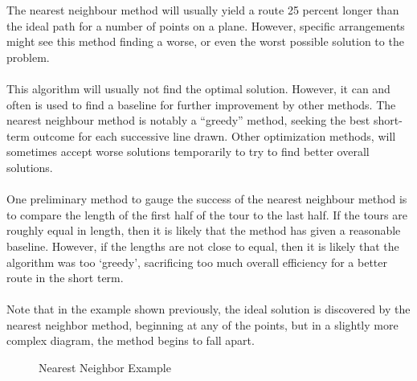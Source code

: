 \documentclass{article}
\begin{document}
The nearest neighbour method will usually yield a route 25 percent longer than the ideal path for a number of points on a plane. However, specific arrangements might see this method finding a worse, or even the worst possible solution to the problem.
\\
\\This algorithm will usually not find the optimal solution. However, it can and often is used to find a baseline for further improvement by other methods. The nearest neighbour method is notably a “greedy” method, seeking the best short-term outcome for each successive line drawn. Other optimization methods, will sometimes accept worse solutions temporarily to try to find better overall solutions. 
\\
\\One preliminary method to gauge the success of the nearest neighbour method is to compare the length of the first half of the tour to the last half. If the tours are roughly equal in length, then it is likely that the method has given a reasonable baseline. However, if the lengths are not close to equal, then it is likely that the algorithm was too ‘greedy’, sacrificing too much overall efficiency for a better route in the short term. 
\cite{yenigun2023}
\\
\\Note that in the example shown previously, the ideal solution is discovered by the nearest neighbor method, beginning at any of the points, but in a slightly more complex diagram, the method begins to fall apart.
\begin{figure}[h]
\centering
{}
\caption{Nearest Neighbor Example}
\end{figure}
\end{document}
